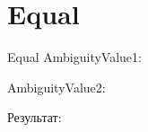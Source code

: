 \section{Equal}
\begin{frame}{Equal}
	AmbiguityValue1:


	AmbiguityValue2:


	Результат:

\end{frame}
